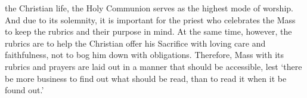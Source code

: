 {}
 the Christian life, the Holy Communion serves as the highest mode of worship. And due to its solemnity, it is important for the priest who celebrates the Mass to keep the rubrics and their purpose in mind. At the same time, however, the rubrics are to help the Christian offer his Sacrifice with loving care and faithfulness, not to bog him down with obligations. Therefore, Mass with its rubrics and prayers are laid out in a manner that should be accessible, lest `there be more business to find out what should be read, than to read it when it be found out.'

